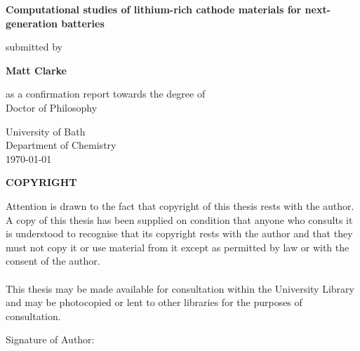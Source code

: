 \documentclass[12pt, oneside]{report}
\begin{document}
	
\setcounter{tocdepth}{1} 

\begin{titlepage}
\begin{center}
\vspace*{1cm}
 
\Large
\textbf{Computational studies of lithium-rich cathode materials for next-generation batteries}
       
\vspace{0.5cm}
\normalsize       
submitted by
       
      
\Large
\textbf{Matt Clarke}
 
\vspace{0.5cm}
\normalsize
as a confirmation report towards the degree of\\
Doctor of Philosophy
 
\vspace{0.5cm}
       
\LARGE
University of Bath\\
\normalsize
Department of Chemistry\\
       
\vspace{0.8cm}
\today
       
\vfill
\large
\textbf{COPYRIGHT}
\end{center}
Attention is drawn to the fact that copyright of this thesis rests with the author. A
copy of this thesis has been supplied on condition that anyone who consults it is
understood to recognise that its copyright rests with the author and that they must
not copy it or use material from it except as permitted by law or with the consent of
the author.
\\
\\
This thesis may be made available for consultation within the University Library and may be photocopied or lent to other libraries for the purposes of consultation.

\vspace{2cm}
\noindent Signature of Author: \dotfill
   
\end{titlepage}



\tableofcontents
\newpage


\newpage


\newpage
\end{document}
